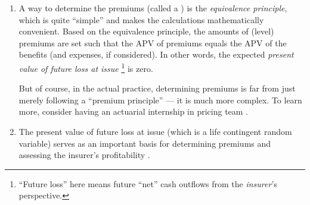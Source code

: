 \begin{enumerate}
\item A way to determine the premiums (called a ) is
the \emph{equivalence principle}, which is quite ``simple'' and makes the
calculations mathematically convenient. Based on the equivalence principle, the
amounts of (level) premiums are set such that the APV of premiums equals the
APV of the benefits (and expenses, if considered). In other words, the expected
\emph{present value of future loss at issue} 
\footnote{``Future loss'' here means future ``net'' cash outflows from the
\emph{insurer}'s  perspective.} is zero.

\begin{note}
But of course, in the actual practice, determining premiums is far from just
merely following a ``premium principle'' --- it is much more complex. To learn
more, consider having an actuarial internship in pricing team
.
\end{note}


\item The present value of future loss at issue  (which is a life
contingent random variable) serves as an important basis for determining
premiums  and assessing the insurer's profitability
.
\end{enumerate}
